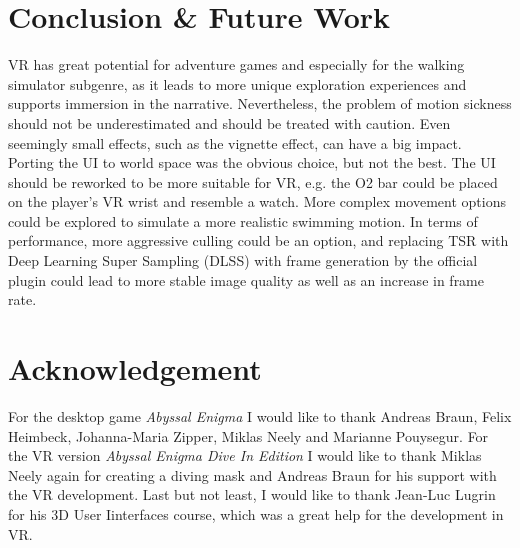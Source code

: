 \documentclass[letterpaper, 10 pt, conference]{ieeeconf}  %
\begin{document}
\section{Conclusion \& Future Work}
\label{Sec:ConcFuture}

VR has great potential for adventure games and especially for the walking simulator subgenre, 
as it leads to more unique exploration experiences and supports immersion in the narrative.
Nevertheless, the problem of motion sickness should not be underestimated and should be treated with caution.
Even seemingly small effects, such as the vignette effect, can have a big impact.
Porting the UI to world space was the obvious choice, but not the best.
The UI should be reworked to be more suitable for VR, e.g. the O2 bar could be placed on the player's VR wrist and resemble a watch.
More complex movement options could be explored to simulate a more realistic swimming motion.
In terms of performance, more aggressive culling could be an option, and replacing TSR with Deep Learning Super Sampling (DLSS) with frame generation by the official plugin could lead to more stable image quality as well as an increase in frame rate.

\section*{Acknowledgement}
\label{Sec:Acknowledgement}
For the desktop game \textit{Abyssal Enigma} I would like to thank Andreas Braun, Felix Heimbeck, Johanna-Maria Zipper, Miklas Neely and Marianne Pouysegur.
For the VR version \textit{Abyssal Enigma Dive In Edition} I would like to thank Miklas Neely again for creating a diving mask and Andreas Braun for his support with the VR development.
Last but not least, I would like to thank Jean-Luc Lugrin for his 3D User Iinterfaces course, which was a great help for the development in VR.


\end{document}
